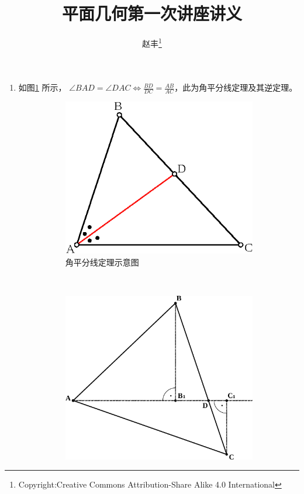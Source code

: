 \documentclass{article}
\begin{document}
\title{平面几何第一次讲座讲义}
\author{赵丰\footnote{Copyright:Creative Commons Attribution-Share Alike 4.0 International}}
\maketitle
\begin{enumerate}
\item 

如图\ref{fig:Triangle_ABC_with_bisector_AD} 所示，
$\angle BAD = \angle DAC \Leftrightarrow
\frac{BD}{DC}=\frac{AB}{AC}$，此为角平分线定理及其逆定理。

    \begin{figure}[!ht]
    \centering
    \begin{subfigure}[b]{0.45\textwidth}
    \includegraphics[width=\textwidth]{Triangle_ABC_with_bisector_AD.eps}
    \caption{角平分线定理示意图}\label{fig:Triangle_ABC_with_bisector_AD}
    \end{subfigure}~
    \begin{subfigure}[b]{0.45\textwidth}
    \includegraphics[width=\textwidth]{Bisekt.eps}

\end{subfigure}
\end{figure}
\end{enumerate}
\end{document}
